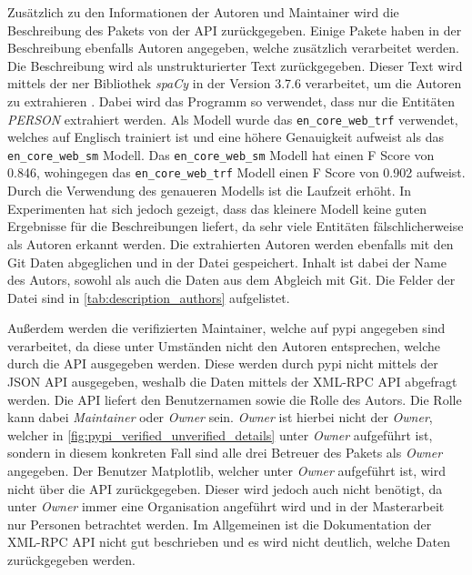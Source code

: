 Zusätzlich zu den Informationen der Autoren und Maintainer wird die Beschreibung des Pakets von der API zurückgegeben.
Einige Pakete haben in der Beschreibung ebenfalls Autoren angegeben, welche zusätzlich verarbeitet werden.
Die Beschreibung wird als unstrukturierter Text zurückgegeben.
Dieser Text wird mittels der \gls{ner} Bibliothek \emph{spaCy} in der Version 3.7.6 verarbeitet, um die Autoren zu extrahieren \autocite{honnibal_spacy_2020}.
Dabei wird das Programm so verwendet, dass nur die Entitäten \emph{PERSON} extrahiert werden.
Als Modell wurde das \texttt{en\_core\_web\_trf} verwendet, welches auf Englisch trainiert ist und eine höhere Genauigkeit aufweist als das \texttt{en\_core\_web\_sm} Modell.
Das \texttt{en\_core\_web\_sm} Modell hat einen F Score von 0.846, wohingegen das \texttt{en\_core\_web\_trf} Modell einen F Score von 0.902 aufweist.
Durch die Verwendung des genaueren Modells ist die Laufzeit erhöht. 
In Experimenten hat sich jedoch gezeigt, dass das kleinere Modell keine guten Ergebnisse für die Beschreibungen liefert, da sehr viele Entitäten fälschlicherweise als Autoren erkannt werden.
Die extrahierten Autoren werden ebenfalls mit den Git Daten abgeglichen und in der Datei  gespeichert.
Inhalt ist dabei der Name des Autors, sowohl als auch die Daten aus dem Abgleich mit Git.
Die Felder der Datei sind in \autoref{tab:description_authors} aufgelistet.

Außerdem werden die verifizierten Maintainer, welche auf \gls{pypi} angegeben sind verarbeitet, da diese unter Umständen nicht den Autoren entsprechen, welche durch die API ausgegeben werden.
Diese werden durch \gls{pypi} nicht mittels der JSON API ausgegeben, weshalb die Daten mittels der XML-RPC API abgefragt werden.
Die API liefert den Benutzernamen sowie die Rolle des Autors.
Die Rolle kann dabei \emph{Maintainer} oder \emph{Owner} sein.
\emph{Owner} ist hierbei nicht der \emph{Owner}, welcher in \autoref{fig:pypi_verified_unverified_details} unter \emph{Owner} aufgeführt ist, sondern in diesem konkreten Fall sind alle drei Betreuer des Pakets als \emph{Owner} angegeben.
Der Benutzer \grqq Matplotlib\glqq{}, welcher unter \emph{Owner} aufgeführt ist, wird nicht über die API zurückgegeben.
Dieser wird jedoch auch nicht benötigt, da unter \emph{Owner} immer eine Organisation angeführt wird und in der Masterarbeit nur Personen betrachtet werden.
Im Allgemeinen ist die Dokumentation der XML-RPC API nicht gut beschrieben und es wird nicht deutlich, welche Daten zurückgegeben werden.

